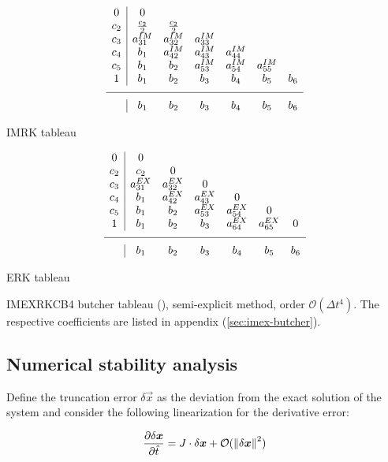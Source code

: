 \documentclass[final]{jpp}
\begin{document}
\begin{table}
\renewcommand\arraystretch{1.2}
\begin{subtable}{0.5\textwidth}
\[
\begin{array}
{c|cccccc}
0 & 0\\
c_2 & \frac{c_2}{2} & \frac{c_2}{2} \\
c_3 & a_{31}^{IM} & a_{32}^{IM} & a_{33}^{IM} \\
c_4 & b_1 & a_{42}^{IM} & a_{43}^{IM} & a_{44}^{IM} \\
c_5 & b_1 & b_2 & a_{53}^{IM} & a_{54}^{IM} & a_{55}^{IM}\\
1 & b_1 & b_2 & b_3 & b_4 & b_5 & b_6 \\
\hline
& b_1 & b_2 & b_3 & b_4 & b_5 & b_6
\end{array}
\]
\caption{IMRK tableau}
\end{subtable}
\begin{subtable}{0.5\textwidth}
\[
\begin{array}
{c|cccccc}
0 & 0\\
c_2 & c_2 & 0 \\
c_3 & a_{31}^{EX} & a_{32}^{EX} & 0 \\
c_4 & b_1 & a_{42}^{EX} & a_{43}^{EX} & 0 \\
c_5 & b_1 & b_2 & a_{53}^{EX} & a_{54}^{EX} & 0\\
1 & b_1 & b_2 & b_3 & a_{64}^{EX} & a_{65}^{EX} & 0 \\
\hline
& b_1 & b_2 & b_3 & b_4 & b_5 & b_6
\end{array}
\]
\caption{ERK tableau}
\end{subtable}
\caption{IMEXRKCB4 butcher tableau (\cite{lowstorageimex}), semi-explicit method, order $\mathcal{O}(\Delta t^4)$. The respective coefficients are listed in appendix (\ref{sec:imex-butcher}).}
\label{tab:imexrkcb4}
\end{table}

\subsection{Numerical stability analysis}

Define the truncation error $\delta \vec{x}$ as the deviation from the exact solution of the system and consider the following linearization for the derivative error:

\begin{align} \label{eq:trunc}
\frac{\partial\delta\bm{x}}{\partial \hat{t}} =
J \cdot \delta\bm{x} + \mathcal{O}(\left\lVert\delta\bm{x}\right\rVert^2)
\end{align}
\end{document}

